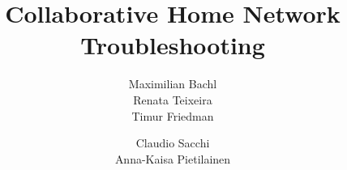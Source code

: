 \documentclass{sig-alternate-10pt}
\begin{document}
\title{Collaborative Home Network Troubleshooting}

%
%
%
%
%

%
\author{
%
%
\alignauthor
Maximilian Bachl\\
\alignauthor
Renata Teixeira\\
\alignauthor
Timur Friedman\\
\and
\alignauthor
Claudio Sacchi\\
\alignauthor
Anna-Kaisa Pietilainen\\
}
\end{document}
